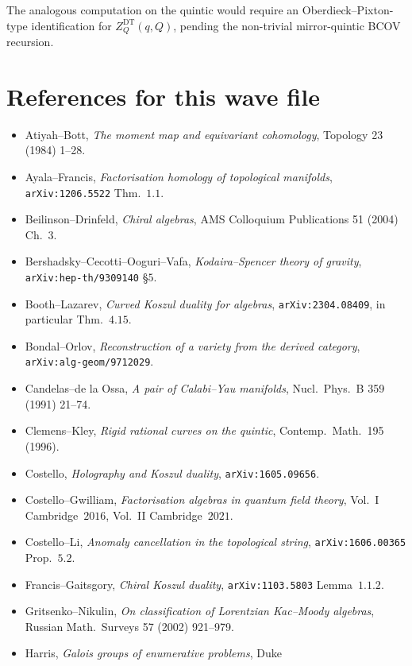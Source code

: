 \documentclass[11pt]{amsart}
\begin{document}
The analogous computation on the quintic would require an
Oberdieck--Pixton-type identification for $Z_Q^{\mathrm{DT}}(q, Q)$,
pending the non-trivial mirror-quintic BCOV recursion.

\section{References for this wave file}

\begin{itemize}[leftmargin=2em]
\item Atiyah--Bott, \emph{The moment map and equivariant cohomology},
Topology 23 (1984) 1--28.
\item Ayala--Francis, \emph{Factorisation homology of topological
manifolds}, \texttt{arXiv:1206.5522} Thm.~$1.1$.
\item Beilinson--Drinfeld, \emph{Chiral algebras}, AMS Colloquium
Publications 51 (2004) Ch.~$3$.
\item Bershadsky--Cecotti--Ooguri--Vafa, \emph{Kodaira--Spencer theory
of gravity}, \texttt{arXiv:hep-th/9309140} \S$5$.
\item Booth--Lazarev, \emph{Curved Koszul duality for algebras},
\texttt{arXiv:2304.08409}, in particular Thm.~$4.15$.
\item Bondal--Orlov, \emph{Reconstruction of a variety from the
derived category}, \texttt{arXiv:alg-geom/9712029}.
\item Candelas--de la Ossa, \emph{A pair of Calabi--Yau manifolds},
Nucl.\ Phys.\ B 359 (1991) 21--74.
\item Clemens--Kley, \emph{Rigid rational curves on the quintic},
Contemp.\ Math.\ 195 (1996).
\item Costello, \emph{Holography and Koszul duality},
\texttt{arXiv:1605.09656}.
\item Costello--Gwilliam, \emph{Factorisation algebras in quantum
field theory}, Vol.\ I Cambridge~$2016$, Vol.\ II Cambridge~$2021$.
\item Costello--Li, \emph{Anomaly cancellation in the topological
string}, \texttt{arXiv:1606.00365} Prop.~$5.2$.
\item Francis--Gaitsgory, \emph{Chiral Koszul duality},
\texttt{arXiv:1103.5803} Lemma~$1.1.2$.
\item Gritsenko--Nikulin, \emph{On classification of Lorentzian
Kac--Moody algebras}, Russian Math.\ Surveys 57 (2002) 921--979.
\item Harris, \emph{Galois groups of enumerative problems}, Duke

\end{itemize}
\end{document}
